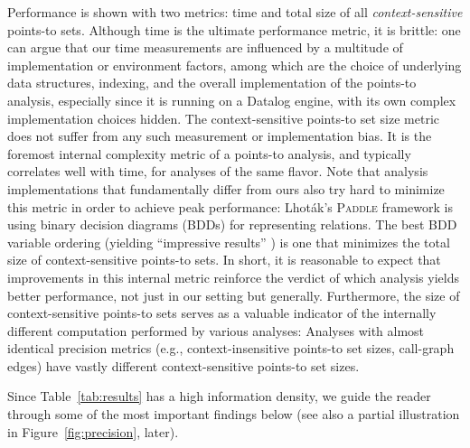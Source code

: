 Performance is shown with two metrics: time and total size of all
\emph{context-sensitive} points-to sets. Although time is the ultimate
performance metric, it is brittle: one can argue that our time
measurements are influenced by a multitude of implementation or
environment factors, among which are the choice of underlying data
structures, indexing, and the overall implementation of the points-to
analysis, especially since it is running on a Datalog engine, with its
own complex implementation choices hidden. The context-sensitive
points-to set size metric does not suffer from any such measurement or
implementation bias. It is the foremost internal complexity metric of
a points-to analysis, and typically correlates well with time, for
analyses of the same flavor.  Note that analysis implementations that
fundamentally differ from ours also try hard to minimize this metric
in order to achieve peak performance: Lhot\'{a}k's \textsc{Paddle}
framework \cite{Lhotak:2006:PAU} is using binary decision diagrams
(BDDs) for representing relations. The best BDD variable ordering
(yielding ``impressive results'' \cite{DBLP:conf/pldi/BerndlLQHU03})
is one that minimizes the total size of context-sensitive points-to
sets. In short, it is reasonable to expect that improvements in this
internal metric reinforce the verdict of which analysis yields better
performance, not just in our setting but generally. Furthermore, the
size of context-sensitive points-to sets serves as a valuable
indicator of the internally different computation performed by various
analyses: Analyses with almost identical precision metrics (e.g.,
context-insensitive points-to set sizes, call-graph edges) have vastly
different context-sensitive points-to set sizes.


Since Table~\ref{tab:results} has a high information density, we guide
the reader through some of the most important findings below (see also
a partial illustration in Figure~\ref{fig:precision}, later).

